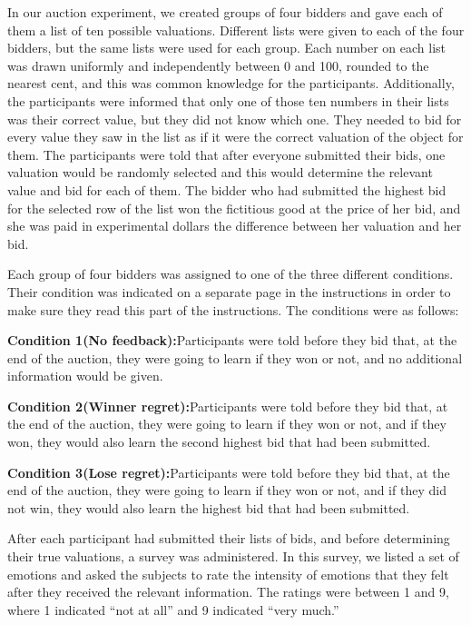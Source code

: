 \documentclass[10pt,a4paper,oneside]{report}
\begin{document}
\noindent In our auction experiment, we created groups of four bidders and gave each of them a list of ten possible valuations. Different lists were given to each of the four bidders, but the same lists were used for each group. Each number on each list was drawn uniformly and independently between 0 and 100, rounded to the nearest cent, and this was common knowledge for the participants. Additionally, the participants were informed that only one of those ten numbers in their lists was their correct value, but they did not know which one. They needed to bid for every value they saw in the list as if it were the correct valuation of the object for them. The participants were told that after everyone submitted their bids, one valuation would be randomly selected and this would determine the relevant value and bid for each of them. The bidder who had submitted the highest bid for the selected row of the list won the fictitious good at the price of her bid, and she was paid in experimental dollars the difference between her valuation and her bid.\citep{filizy2005auctions}

\noindent Each group of four bidders was assigned to one of the three different conditions. Their condition was indicated on a separate page in the instructions in order to make sure they read this part of the instructions. The conditions were as follows:\citep{filizy2005auctions}

\noindent \textbf{Condition 1(No feedback):}Participants were told before they bid that, at the end of the auction, they were going to learn if they won or not, and no additional information would be given.

\noindent \textbf{Condition 2(Winner regret):}Participants were told before they bid that, at the end of the auction, they were going to learn if they won or not, and if they won, they would also learn the second highest bid that had been submitted.

\noindent \textbf{Condition 3(Lose regret):}Participants were told before they bid that, at the end of the auction, they were going to learn if they won or not, and if they did not win, they would also learn the highest bid that had been submitted.

\noindent After each participant had submitted their lists of bids, and before determining their true valuations, a survey was administered. In this survey, we listed a set of emotions and asked the subjects to rate the intensity of emotions that they felt after they received the relevant information. The ratings were between 1 and 9, where 1 indicated “not at all” and 9 indicated “very much.”
\end{document}
